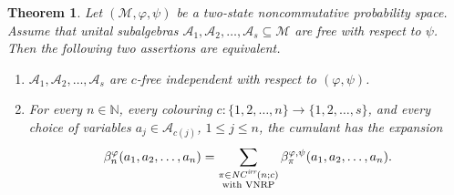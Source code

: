 \documentclass[12pt]{amsart}
\DeclareMathOperator{\NCirr}{{\mathit{NC}^\textit{irr}}} %
\DeclareMathOperator{\VNRPirr}{{\mathit{VNRP}^\textit{irr}}} %
\newtheorem{theorem}{Theorem}[section]
\theoremstyle{definition}
\numberwithin{equation}{section}
\begin{document}
\begin{theorem}
  \label{thm:VNTPCfree}
  Let $( \mathcal{M} , \varphi,\psi )$ be a two-state noncommutative
  probability space. Assume that  unital subalgebras
  $\mathcal{A}_1,\mathcal{A}_2,\ldots,\mathcal{A}_s\subseteq \mathcal{M}$
  are free with respect to $\psi$. 
  Then the following two assertions are equivalent.
  \begin{enumerate}[label=(\roman*)]
   \item
    $\mathcal{A}_1,\mathcal{A}_2,\ldots,\mathcal{A}_s$ are $c$-free
    independent with respect to $(\varphi,\psi)$.
    
   \item 	
    For every $n \in \mathbb{N}$, every colouring 
    $c : \{ 1,2, \ldots , n \} \to \{ 1,2, \ldots , s \}$, and every choice of variables
    $a_j \in \mathcal{A}_{c(j)}$, $1\leq j\leq n$, the cumulant has the expansion
    \begin{equation}
      \label{eq:VNRP:cfree}
      \beta_n^{\varphi} (a_1,a_2, \ldots , a_n) = 
      \sum_{
        \substack{
          \pi \in \NCirr(n;c) \\
          \textnormal{with VNRP}
        }
      }
      \beta_{\pi}^{\varphi,\psi}(a_1,a_2,\ldots,a_n).
    \end{equation}
  \end{enumerate}
\end{theorem}
\end{document}
